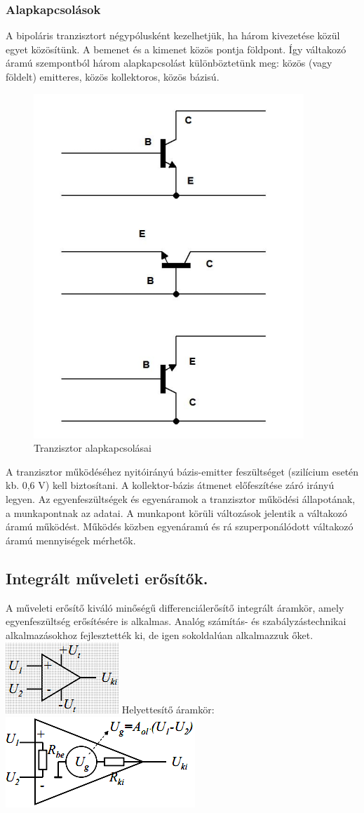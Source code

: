 \subsubsection{Alapkapcsolások}
A bipoláris tranzisztort négypólusként kezelhetjük, ha három kivezetése közül egyet közösítünk. A bemenet és a kimenet közös pontja földpont. Így váltakozó áramú szempontból három alapkapcsolást különböztetünk meg: közös (vagy földelt) emitteres, közös kollektoros, közös bázisú.
\begin{figure}[h]
	\centering
	\includegraphics[width=0.5\linewidth]{fig/10-alapkapcs}
	\caption{Tranzisztor alapkapcsolásai}
	\label{fig:10-alapkapcs}
\end{figure}

A tranzisztor működéséhez nyitóirányú bázis-emitter feszültséget (szilícium esetén kb. 0,6 V) kell biztosítani. A kollektor-bázis átmenet előfeszítése záró irányú legyen. Az egyenfeszültségek és egyenáramok a tranzisztor működési állapotának, a munkapontnak az adatai. A munkapont körüli változások jelentik a váltakozó áramú működést. Működés közben egyenáramú és rá szuperponálódott váltakozó áramú mennyiségek mérhetők. 


\subsection{Integrált műveleti erősítők.}
A műveleti erősítő kiváló minőségű differenciálerősítő integrált áramkör, amely egyenfeszültség erősítésére is alkalmas. Analóg számítás- és szabályzástechnikai alkalmazásokhoz fejlesztették ki, de igen sokoldalúan alkalmazzuk őket.\\
\includegraphics[width=0.25\linewidth]{fig/10-op_amp}\quad
Helyettesítő áramkör: \includegraphics[width=0.5\linewidth]{fig/10-op_amp1}\\

